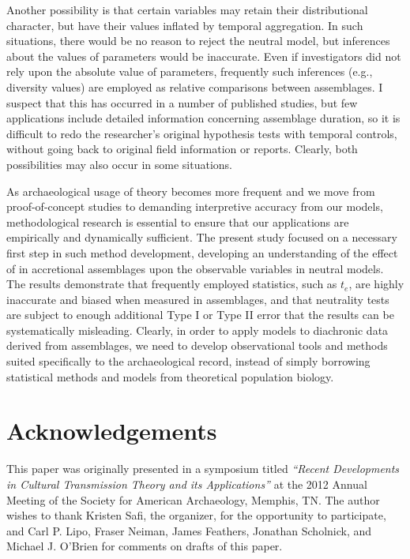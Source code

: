 Another possibility is that certain variables may retain their distributional character, but have their values inflated by temporal aggregation.  In such situations, there would be no reason to reject the neutral model, but inferences about the values of parameters would be inaccurate.  Even if investigators did not rely upon the absolute value of parameters, frequently such inferences (e.g., diversity values) are employed as relative comparisons between assemblages.   I suspect that this has occurred in a number of published studies, but few \ct applications include detailed information concerning assemblage duration, so it is difficult to redo the researcher's original hypothesis tests with temporal controls, without going back to original field information or reports.  Clearly, both possibilities may also occur in some situations.  

As archaeological usage of \ct theory becomes more frequent and we move from proof-of-concept studies to demanding interpretive accuracy from our models, methodological research is essential to ensure that our applications are empirically and dynamically sufficient.  The present study focused on a necessary first step in such method development, developing an understanding of the effect of \timeav in accretional assemblages upon the observable variables in neutral \ct models.  The results demonstrate that frequently employed statistics, such as $t_e$, are highly inaccurate and biased when measured in \timeavd assemblages, and that neutrality tests are subject to enough additional Type I or Type II error that the results can be systematically misleading.  Clearly, in order to apply \ct models to diachronic data derived from \timeavd assemblages, we need to develop observational tools and methods suited specifically to the archaeological record, instead of simply borrowing statistical methods and models from theoretical population biology.  



\section{Acknowledgements}
This paper was originally presented in a symposium titled \emph{``Recent Developments in Cultural Transmission Theory and its Applications''} at the 2012 Annual Meeting of the Society for American Archaeology, Memphis, TN.  The author wishes to thank Kristen Safi, the organizer, for the opportunity to participate, and Carl P. Lipo, Fraser Neiman, James Feathers, Jonathan Scholnick, and Michael J. O'Brien for comments on drafts of this paper. 





